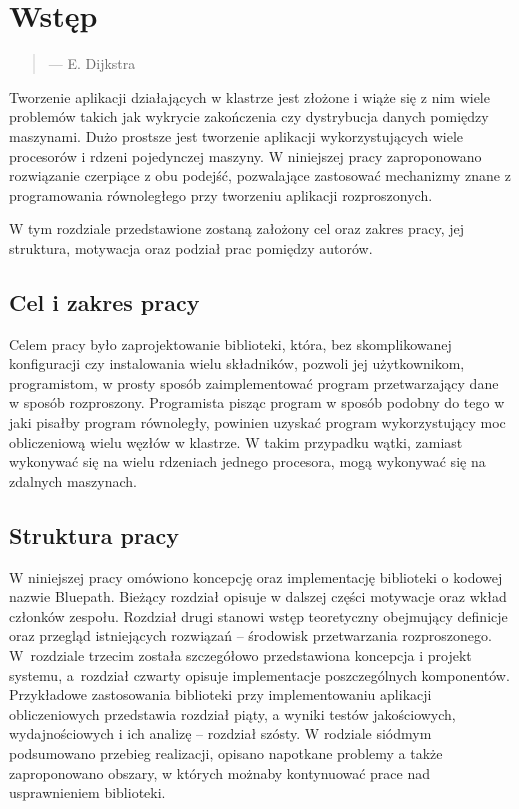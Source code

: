 
\chapter{Wstęp}
\begin{quote}

\begin{flushright}
--- E. Dijkstra
\par\end{flushright}
\end{quote}
Tworzenie aplikacji działających w klastrze jest złożone i wiąże się
z nim wiele problemów takich jak wykrycie zakończenia czy dystrybucja
danych pomiędzy maszynami. Dużo prostsze jest tworzenie aplikacji
wykorzystujących wiele procesorów i rdzeni pojedynczej maszyny. W
niniejszej pracy zaproponowano rozwiązanie czerpiące z obu podejść,
pozwalające zastosować mechanizmy znane z programowania równoległego
przy tworzeniu aplikacji rozproszonych.

W tym rozdziale przedstawione zostaną założony cel oraz zakres pracy,
jej struktura, motywacja oraz podział prac pomiędzy autorów.


\section{Cel i zakres pracy}

\label{sec:intro-cel-i-zakres}Celem pracy było zaprojektowanie biblioteki,
która, bez skomplikowanej konfiguracji czy instalowania wielu składników,
pozwoli jej użytkownikom, programistom, w prosty sposób zaimplementować
program przetwarzający dane w sposób rozproszony. Programista pisząc
program w sposób podobny do tego w jaki pisałby program równoległy,
powinien uzyskać program wykorzystujący moc obliczeniową wielu węzłów
w klastrze. W takim przypadku wątki, zamiast wykonywać się na wielu
rdzeniach jednego procesora, mogą wykonywać się na zdalnych maszynach.


\section{Struktura pracy}

W niniejszej pracy omówiono koncepcję oraz implementację biblioteki
o kodowej nazwie Bluepath. Bieżący rozdział opisuje w dalszej części
motywacje oraz wkład członków zespołu. Rozdział drugi stanowi wstęp
teoretyczny obejmujący definicje oraz przegląd istniejących rozwiązań
-- środowisk przetwarzania rozproszonego. W~rozdziale trzecim została
szczegółowo przedstawiona koncepcja i projekt systemu, a~rozdział
czwarty opisuje implementacje poszczególnych komponentów. Przykładowe
zastosowania biblioteki przy implementowaniu aplikacji obliczeniowych
przedstawia rozdział piąty, a wyniki testów jakościowych, wydajnościowych
i ich analizę -- rozdział szósty. W rodziale siódmym podsumowano przebieg
realizacji, opisano napotkane problemy a także zaproponowano obszary,
w których możnaby kontynuować prace nad usprawnieniem biblioteki.


